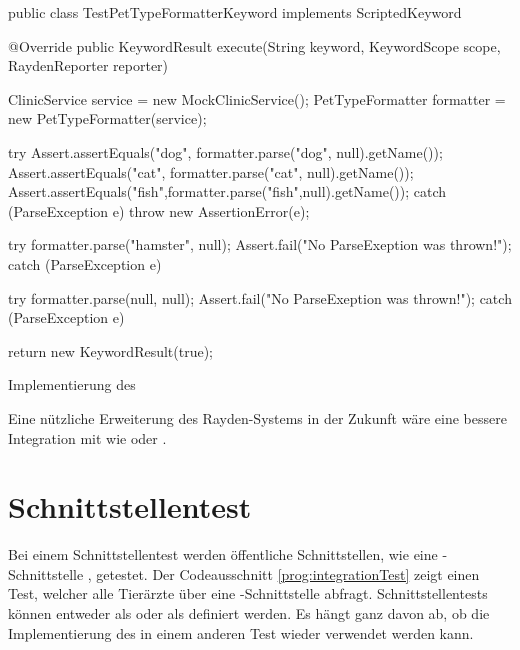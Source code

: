 \begin{program}
\begin{JavaCode}
public class TestPetTypeFormatterKeyword implements ScriptedKeyword {

  @Override
  public KeywordResult execute(String keyword, KeywordScope scope, RaydenReporter reporter) {
    ClinicService service = new MockClinicService();
    PetTypeFormatter formatter = new PetTypeFormatter(service);

    try {
     Assert.assertEquals("dog", formatter.parse("dog", null).getName());
     Assert.assertEquals("cat", formatter.parse("cat", null).getName());
     Assert.assertEquals("fish",formatter.parse("fish",null).getName());
    } catch (ParseException e) {
      throw new AssertionError(e);
    }
    
    try {
      formatter.parse("hamster", null);
      Assert.fail("No ParseExeption was thrown!");
    } catch (ParseException e) {
    }

    try {
      formatter.parse(null, null);
      Assert.fail("No ParseExeption was thrown!");
    } catch (ParseException e) {
    }

    return new KeywordResult(true);
  }
}
\end{JavaCode}
\caption{Implementierung des  }
\label{prog:unitTestImpl}
\end{program}

\SuperPar
Eine nützliche Erweiterung des Rayden-Systems in der Zukunft wäre eine bessere Integration mit  wie  oder .

\section{Schnittstellentest}
\label{cha:TestenApi}

Bei einem Schnittstellentest werden öffentliche Schnittstellen, wie eine -Schnittstelle \cite{Rest}, getestet. Der Codeausschnitt \ref{prog:integrationTest} zeigt einen Test, welcher alle Tierärzte über eine -Schnittstelle abfragt. Schnittstellentests können entweder als  oder als  definiert werden. Es hängt ganz davon ab, ob die Implementierung des  in einem anderen Test wieder verwendet werden kann. 

